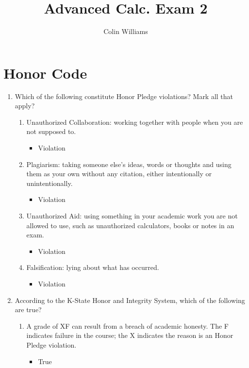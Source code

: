 \documentclass[10pt,a4paper]{article}
\title{Advanced Calc. Exam 2}
\author{Colin Williams}
\theoremstyle{definition}
\begin{document}
\maketitle

\section*{Honor Code}
\begin{enumerate}[label = (\alph*)]
\item Which of the following constitute Honor Pledge violations? Mark all that apply?
	\begin{enumerate}[label = (\roman*)]
	\item Unauthorized Collaboration: working together with people when you are not supposed to.
		\begin{itemize}
		\item Violation
		\end{itemize}
	\item Plagiarism: taking someone else's ideas, words or thoughts and using them as your own without any citation, either intentionally or unintentionally. 
		\begin{itemize}
		\item Violation
		\end{itemize}
	\item Unauthorized Aid: using something in your academic work you are not allowed to use, such as unauthorized calculators, books or notes in an exam.
		\begin{itemize}
		\item Violation
		\end{itemize}
	\item Falsification: lying about what has occurred.
		\begin{itemize}
		\item Violation
		\end{itemize}
	\end{enumerate}
\item According to the K-State Honor and Integrity System, which of the following are true?
	\begin{enumerate}[label = (\roman*)]
	\item A grade of XF can result from a breach of academic honesty. The F indicates failure in the course; the X indicates the reason is an Honor Pledge violation. 
		\begin{itemize}
		\item True
		\end{itemize}

\end{enumerate}
\end{enumerate}
\end{document}
